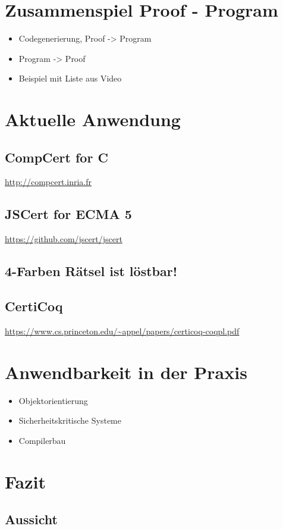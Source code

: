 \section{Zusammenspiel Proof - Program}
\begin{itemize}
	\item Codegenerierung, Proof -> Program
	\item Program -> Proof
	\item Beispiel mit Liste aus Video
\end{itemize}

\section{Aktuelle Anwendung}
\subsection{CompCert for C}
\url{http://compcert.inria.fr}
\subsection{JSCert for ECMA 5}
\url{https://github.com/jscert/jscert}
\subsection{4-Farben Rätsel ist löstbar!}
\subsection{CertiCoq}
\url{https://www.cs.princeton.edu/~appel/papers/certicoq-coqpl.pdf}

\section{Anwendbarkeit in der Praxis}
\begin{itemize}
	\item Objektorientierung
	\item Sicherheitskritische Systeme
	\item Compilerbau
\end{itemize}


\section{Fazit}
\subsection{Aussicht}

